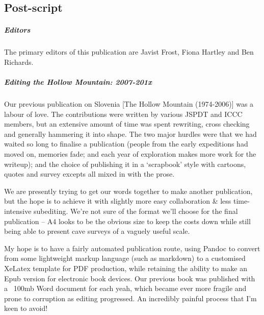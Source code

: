 \newpage
 
 \begin{tcolorbox}
 	\begin{fullwidth}
 	\chapter{Post-script}
 		\begin{multicols}{2}


            \paragraph{Editors}
            The primary editors of this publication are Javist Frost, Fiona Hartley and Ben Richards. 


            \paragraph{Editing the Hollow Mountain: 2007-201x}

            Our previous publication on Slovenia [The Hollow Mountain (1974-2006)] was a labour of love. The contributions were written by various JSPDT and ICCC members, but an extensive amount of time was spent rewriting, cross checking and generally hammering it into shape. The two major hurdles were that we had waited so long to finalise a publication (people from the early expeditions had moved on, memories fade; and each year of exploration makes more work for the writeup); and the choice of publishing it in a ‘scrapbook’ style with cartoons, quotes and survey excepts all mixed in with the prose.
            
            We are presently trying to get our words together to make another publication, but the hope is to achieve it with slightly more easy collaboration \& less time-intensive subediting. We’re not sure of the format we’ll choose for the final publication – A4 looks to be the obvious size to keep the costs down while still being able to present cave surveys of a vaguely useful scale.
            
            My hope is to have a fairly automated publication route, using Pandoc to convert from some lightweight markup language (such as markdown) to a customised XeLatex template for PDF production, while retaining the ability to make an Epub version for electronic book devices. Our previous book was published with a ~100mb Word document for each yeah, which became ever more fragile and prone to corruption as editing progressed. An incredibly painful process that I’m keen to avoid! 
            

\end{multicols}
\end{fullwidth}
\end{tcolorbox}
